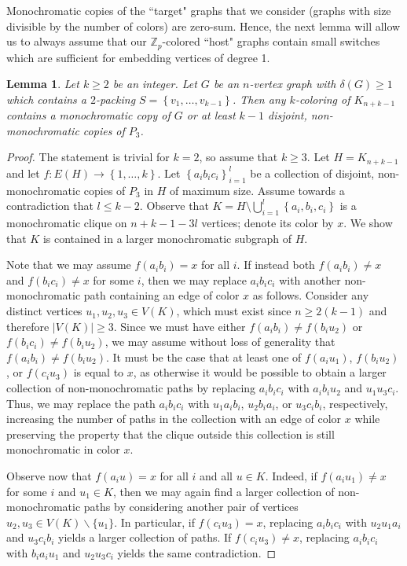 \documentclass[11pt]{article}
\newcommand{\bZ}{\mathbb{Z}}
\newcommand\set[1]{\left\{ #1 \right\}}
\newcommand\abs[1]{\left\lvert #1 \right\rvert}
\theoremstyle{definition}
\theoremstyle{plain}
\newtheorem{lem}{Lemma}
\begin{document}
Monochromatic copies of the ``target" graphs that we consider (graphs with size divisible by the number of colors) are zero-sum. Hence, the next lemma will allow us to always assume that our $\bZ_p$-colored ``host" graphs contain small switches which are sufficient for embedding vertices of degree 1.
\begin{lem}
    Let $k\geq 2$ be an integer. Let $G$ be an $n$-vertex graph with $\delta(G)\geq 1$ which contains a $2$-packing $S=\set{v_1,\ldots,v_{k-1}}$. Then any $k$-coloring of $K_{n+k-1}$ contains a monochromatic copy of $G$ or at least $k-1$ disjoint, non-monochromatic copies of $P_3$.
    \label{lem:p3s}
\end{lem}
\begin{proof}
    The statement is trivial for $k=2$, so assume that $k\geq 3$. Let $H=K_{n+k-1}$ and let $f:E(H)\to \set{1,\ldots,k}$. Let $\set{a_ib_ic_i}_{i=1}^{l}$ be a collection of disjoint, non-monochromatic copies of $P_3$ in $H$ of maximum size. Assume towards a contradiction that $l\leq k-2$. Observe that $K=H\setminus\bigcup_{i=1}^{l}\set{a_i,b_i,c_i}$ is a monochromatic clique on $n+k-1-3l$ vertices; denote its color by $x$. We show that $K$ is contained in a larger monochromatic subgraph of $H$.
    
    Note that we may assume $f(a_ib_i)=x$ for all $i$. If instead both $f(a_ib_i)\neq x$ and $f(b_ic_i)\neq x$ for some $i$, then we may replace $a_ib_ic_i$ with another non-monochromatic path containing an edge of color $x$ as follows. Consider any distinct vertices $u_1,u_2,u_3\in V(K)$, which must exist since $n\geq 2(k-1)$ and therefore $\abs{V(K)}\geq 3$. 
    Since we must have either $f(a_ib_i)\neq f(b_iu_2)$ or $f(b_ic_i)\neq f(b_iu_2)$, we may assume without loss of generality that $f(a_ib_i)\neq f(b_iu_2)$. 
    It must be the case that at least one of $f(a_iu_1)$, $f(b_iu_2)$, or $f(c_iu_3)$ is equal to $x$, as otherwise it would be possible to obtain a larger collection of non-monochromatic paths by replacing $a_ib_ic_i$ with $a_ib_iu_2$ and $u_1u_3c_i$. Thus, we may replace the path $a_ib_ic_i$ with $u_1a_ib_i$, $u_2b_ia_i$, or $u_3c_ib_i$, respectively, increasing the number of paths in the collection with an edge of color $x$ while preserving the property that the clique outside this collection is still monochromatic in color $x$.

    Observe now that $f(a_iu)=x$ for all $i$ and all $u\in K$. Indeed, if $f(a_iu_1)\neq x$ for some $i$ and $u_1\in K$, then we may again find a larger collection of non-monochromatic paths by considering another pair of vertices $u_2,u_3\in V(K)\backslash\{u_1\}$. In particular, if $f(c_iu_3)=x$, replacing $a_ib_ic_i$ with $u_2u_1a_i$ and $u_3c_ib_i$ yields a larger collection of paths. If $f(c_iu_3)\neq x$, replacing $a_ib_ic_i$ with $b_ia_iu_1$ and $u_2u_3c_i$ yields the same contradiction. 


\end{proof}
\end{document}
